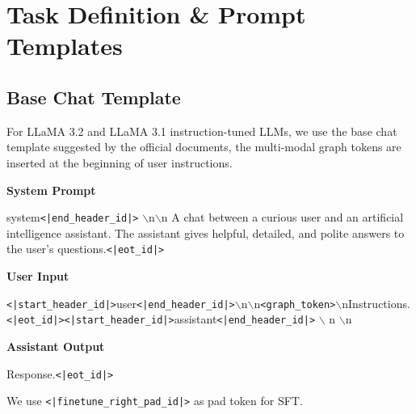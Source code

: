 \section{Task Definition \& Prompt Templates}
\label{sec:taskandprompt}
\subsection{Base Chat Template}
For LLaMA 3.2 and LLaMA 3.1 instruction-tuned LLMs, we use the base chat template suggested by the official documents, the multi-modal graph tokens are inserted at the beginning of user instructions.
\begin{tcolorbox}[colback=white!98!black,colframe=white!30!black,boxsep=1.1pt,top=6.75pt]%
\scriptsize
\noindent\makebox[\textwidth]{\rule{\textwidth}{1pt}}
\textbf{System Prompt}
\\[-0.575em]
\noindent\makebox[\textwidth]{\rule{\textwidth}{1pt}}

system{\tt <|end\_header\_id|>} $\backslash$n$\backslash$n A chat between a curious user and an artificial intelligence assistant. The assistant gives helpful, detailed, and polite answers to the user's questions.{\tt <|eot\_id|>}

\noindent\makebox[\textwidth]{\rule{\textwidth}{1pt}}
\textbf{User Input}
\\[-0.575em]
\noindent\makebox[\textwidth]{\rule{\textwidth}{1pt}}

{\tt <|start\_header\_id|>}user{\tt <|end\_header\_id|>}$\backslash$n$\backslash$n{\tt <graph\_token>}$\backslash$nInstructions.{\tt <|eot\_id|>}{\tt <|start\_header\_id|>}assistant{\tt <|end\_header\_id|>} $\backslash$ n $\backslash$n

\noindent\makebox[\textwidth]{\rule{\textwidth}{1pt}}
\textbf{Assistant Output}
\\[-0.575em]
\noindent\makebox[\textwidth]{\rule{\textwidth}{1pt}}

Response.{\tt <|eot\_id|>}
\end{tcolorbox}

We use {\tt <|finetune\_right\_pad\_id|>} as pad token for SFT.

